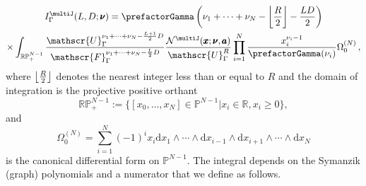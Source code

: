 \documentclass[12pt,a4paper]{article}
\theoremstyle{plain}
\theoremstyle{remark}
\newcommand{\nprops}{N}
\newcommand{\feynpar}{x}
\newcommand{\sumnus}{\nu_1+\dots+\nu_{\nprops}}
\newcommand{\dd}{\mathrm{d}}
\newcommand{\undernotation}[1]{\pmb{#1}}
\begin{document}
	\begin{multline}\label{e:Itensor}
		I_\Gamma^{\multiJ}(L,D;\undernotation{\nu})=   \prefactorGamma\left(\sumnus-\left\lfloor
                    R\over2\right\rfloor-{LD\over2}\right)\cr
                \times\int_{ \mathbb R\mathbb P_+^{\nprops-1}} {\mathscr{U}_\Gamma^{\sumnus-{L+1\over2}D}\over
			\mathscr{F}_\Gamma^{\sumnus-{L\over2}D}}{\mathcal
			N^{\multiJ}(\undernotation x;\undernotation{\nu},\undernotation a)\over \mathscr{U}_\Gamma^R}
		\prod_{i=1}^{\nprops}
		{\feynpar_i^{\nu_i-1}\over\prefactorGamma(\nu_i) }  \Omega_0^{(\nprops)} \, ,
	\end{multline}
	where $\left\lfloor R\over2\right\rfloor$ denotes the nearest
        integer less than or equal to $R$ and the domain of integration
        is the projective positive orthant
        \begin{equation}
          \mathbb R\mathbb P_+^{\nprops-1}:=\{[x_0,\dots, x_{\nprops}]\in
\mathbb P^{\nprops-1}| x_i\in\mathbb R, x_i\geq0\},
\end{equation}
        and
	\begin{equation}
		\Omega_0^{(\nprops)}=\sum_{i=1}^{\nprops} (-1)^i x_i \dd x_1\wedge \cdots
		\wedge \dd x_{i-1}\wedge \dd x_{i+1}\wedge \cdots \wedge \dd x_\nprops
	\end{equation}
	is    the canonical   differential form on $\mathbb
        P^{\nprops-1}$. The integral depends on the Symanzik (graph) polynomials and a numerator that we define as follows.
\end{document}
